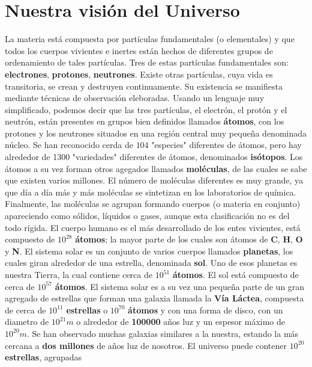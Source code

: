 \documentclass[12pt,a4paper]{book}
\begin{document}
    \section{Nuestra visión del Universo}

    La materia está compuesta por partículas fundamentales (o elementales) y que todos los cuerpos vivientes e inertes están hechos de diferentes grupos de
    ordenamiento de tales partículas. Tres de estas partículas fundamentales son: \textbf{electrones}, \textbf{protones}, \textbf{neutrones}. Existe otras
    partículas, cuya vida es transitoria, se crean y destruyen continuamente. Su existencia se manifiesta mediante técnicas de observación eleboradas. Usando
    un lenguaje muy simplificado, podemos decir que las tres partículas, el electrón, el protón y el neutrón, están presentes en grupos bien definidos llamados
    \textbf{átomos}, con los protones y los neutrones situados en una región central muy pequeña denominada núcleo. Se han reconocido cerda de $104$ "especies"
    diferentes de átomos, pero hay alrededor de 1300 "variedades" diferentes de átomos, denominados \textbf{isótopos}. Los átomos a su vez forman otros agegados
    llamados \textbf{moléculas}, de las cuales se sabe que existen varios millones. El número de moléculas diferentes es muy grande, ya que día a día más y más
    moléculas se sintetizan en los laboratorios de química. Finalmente, las moléculas se agrupan formando cuerpos (o materia en conjunto) apareciendo como sólidos,
    líquidos o gases, aunque esta clasificación no es del todo rígida. El cuerpo humano es el más desarrollado de los entes vivientes, está compuesto de $10^{28}$
    \textbf{átomos}; la mayor parte de los cuales son átomos de \textbf{C}, \textbf{H}, \textbf{O} y \textbf{N}. El sistema solar es un conjunto de varios cuerpos
    llamados \textbf{planetas}, los cuales giran alrededor de una estrella, denominada \textbf{sol}. Uno de esos planetas es nuestra Tierra, la cual contiene cerca
    de $10^{51}$ \textbf{átomos}. El sol está compuesto de cerca de $10^{57}$ \textbf{átomos}. El sistema solar es a su vez una pequeña parte de un gran agregado
    de estrellas que forman una galaxia llamada la \textbf{Vía Láctea}, compuesta de cerca de $10^{11}$ \textbf{estrellas} o $10^{70}$ \textbf{átomos} y con una
    forma de disco, con un diametro de $10^{21}m$ o alrededor de \textbf{100000} años luz y un espesor máximo de $10^{20}m$. Se han observado muchas galaxias
    similares a la nuestra, estando la más cercana a \textbf{dos millones} de años luz de nosotros. El universo puede contener $10^{20}$ \textbf{estrellas}, agrupadas
\end{document}
